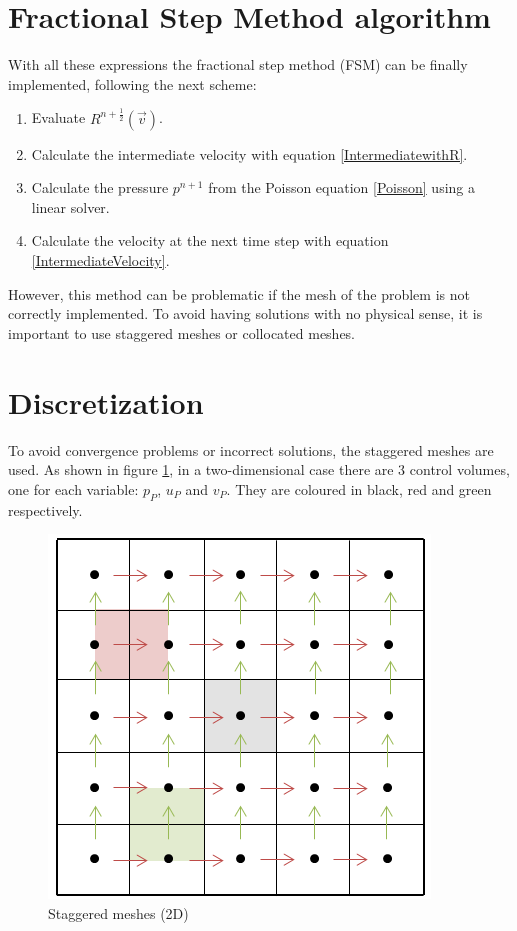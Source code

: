 \section{Fractional Step Method algorithm}
With all these expressions the fractional step method (FSM) can be finally implemented, following the next scheme:
\begin{enumerate}
	\item Evaluate $R^{n+\frac{1}{2}}\left(\vec{v}\right)$.
	\item Calculate the intermediate velocity with equation \ref{IntermediatewithR}.
	\item Calculate the pressure $p^{n+1}$ from the Poisson equation \ref{Poisson} using a linear solver.
	\item Calculate the velocity at the next time step with equation \ref{IntermediateVelocity}.
\end{enumerate}
However, this method can be problematic if the mesh of the problem is not correctly implemented. To avoid having solutions with no physical sense, it is important to use staggered meshes or collocated meshes.

\section{Discretization}
To avoid convergence problems or incorrect solutions, the staggered meshes are used. As shown in figure \ref{staggered}, in a two-dimensional case there are 3 control volumes, one for each variable: $p_{P}$, $u_{P}$ and $v_{P}$. They are coloured in black, red and green respectively.
\begin{figure}
	\centering
	\includegraphics[scale=0.8]{DrivenCavity/staggered}
	\caption{Staggered meshes (2D)}
	\label{staggered}
\end{figure}

